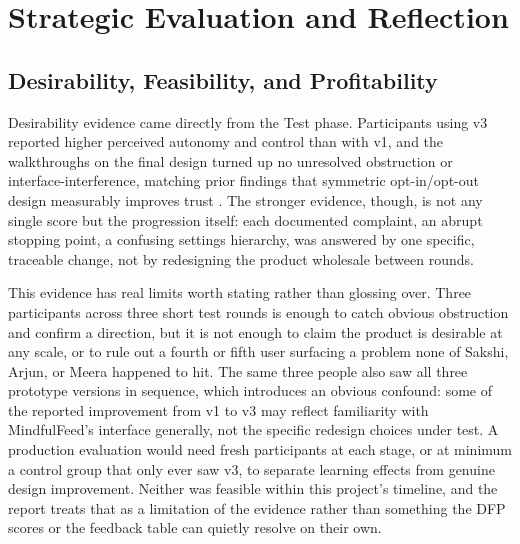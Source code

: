 \documentclass[11pt]{article}
\begin{document}
\FloatBarrier

\section{Strategic Evaluation and Reflection}

\subsection{Desirability, Feasibility, and Profitability}
Desirability evidence came directly from the Test phase. Participants using v3 reported higher perceived autonomy and control than with v1, and the walkthroughs on the final design turned up no unresolved obstruction or interface-interference, matching prior findings that symmetric opt-in/opt-out design measurably improves trust \parencites[2]{4807303}. The stronger evidence, though, is not any single score but the progression itself: each documented complaint, an abrupt stopping point, a confusing settings hierarchy, was answered by one specific, traceable change, not by redesigning the product wholesale between rounds.

This evidence has real limits worth stating rather than glossing over. Three participants across three short test rounds is enough to catch obvious obstruction and confirm a direction, but it is not enough to claim the product is desirable at any scale, or to rule out a fourth or fifth user surfacing a problem none of Sakshi, Arjun, or Meera happened to hit. The same three people also saw all three prototype versions in sequence, which introduces an obvious confound: some of the reported improvement from v1 to v3 may reflect familiarity with MindfulFeed's interface generally, not the specific redesign choices under test. A production evaluation would need fresh participants at each stage, or at minimum a control group that only ever saw v3, to separate learning effects from genuine design improvement. Neither was feasible within this project's timeline, and the report treats that as a limitation of the evidence rather than something the DFP scores or the feedback table can quietly resolve on their own.
\end{document}
